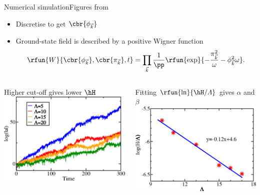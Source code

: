 \documentclass{beamer}
\begin{document}
\begin{frame}{Numerical simulation}{Figures from \cite{Wang2017}}

\begin{itemize}
\item Discretise to get $\cbr{\phi_{\vec k}}$
\item Ground-state field is described by a positive Wigner function
\begin{equation}
\rfun{W}{\cbr{\phi_{\vec k}}, \cbr{\pi_{\vec k}}, t} = \prod_{\vec k}
\frac{1}{\pp}\rfun{\exp}{-\frac{\pi^2_{\vec k}}{\omega}-\phi^2_{\vec k} \omega}.
\end{equation}

\end{itemize}

\begin{columns}

\begin{column}{.49\textwidth}
Higher cut-off gives lower $\hH$\\
\includegraphics[width=\linewidth]{./graphics/FIG.4.png}
\end{column}
\begin{column}{.49\textwidth}
Fitting $\rfun{\ln}{\hH/\varLambda}$ gives $\alpha$ and $\beta$\\
\includegraphics[width=\linewidth]{./graphics/FIG.6.png}
\end{column}

\end{columns}

\end{frame}
\end{document}
